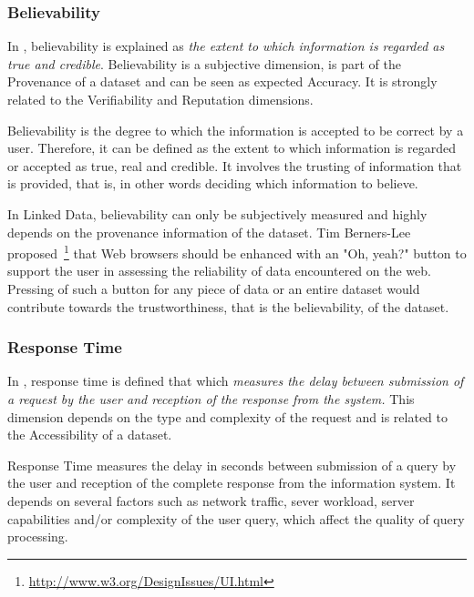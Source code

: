 \subsubsection{Believability}
In \cite{Bizerthesis}, believability is explained as \emph{the extent to which information is regarded as true and credible}.
Believability is a subjective dimension, is part of the Provenance of a dataset and can be seen as expected Accuracy.
It is strongly related to the Verifiability and Reputation dimensions. 


\begin{definition}[Believability]
Believability is the degree to which the information is accepted to be correct by a user.
Therefore, it can be defined as the extent to which information is regarded or accepted as true, real and credible.
It involves the trusting of information that is provided, that is, in other words deciding which information to believe.
\end{definition}

In Linked Data, believability can only be subjectively measured and highly depends on the provenance information of the dataset. 
Tim Berners-Lee proposed~\footnote{\url{http://www.w3.org/DesignIssues/UI.html}} that Web browsers should be enhanced with an "Oh, yeah?" button to support the user in assessing the reliability of data encountered on the web. 
Pressing of such a button for any piece of data or an entire dataset would contribute towards the trustworthiness, that is the believability, of the dataset. 

\subsubsection{Response Time}
In \cite{Bizerthesis}, response time is defined that which \emph{measures the delay between submission of a request by the user and reception of the response from the system.}
This dimension depends on the type and complexity of the request and is related to the Accessibility of a dataset.

\begin{definition}
Response Time measures the delay in seconds between submission of a query by the user and reception of the complete response from the information system.
It depends on several factors such as network traffic, sever workload, server capabilities and/or complexity of the user query, which affect the quality of query processing.
\end{definition}

